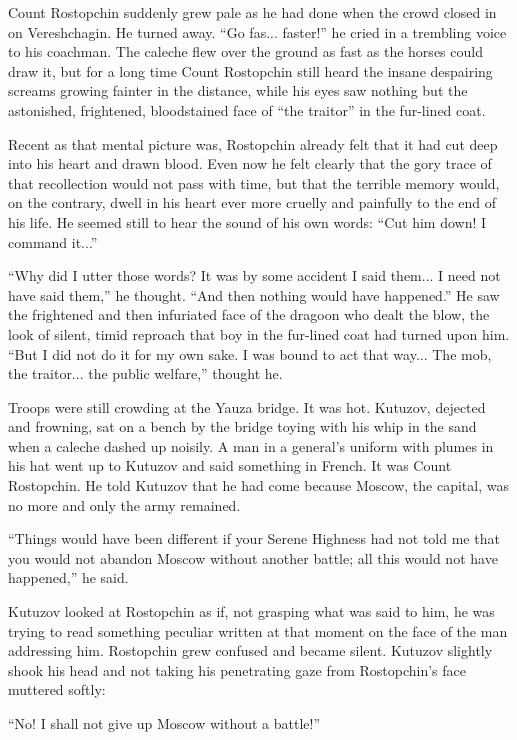 Count Rostopchin suddenly grew pale as he had done when the crowd
closed in on Vereshchagin. He turned away. ``Go fas... faster!''
he cried in a trembling voice to his coachman. The caleche flew
over the ground as fast as the horses could draw it, but for a
long time Count Rostopchin still heard the insane despairing
screams growing fainter in the distance, while his eyes saw
nothing but the astonished, frightened, bloodstained face of
``the traitor'' in the fur-lined coat.

Recent as that mental picture was, Rostopchin already felt that
it had cut deep into his heart and drawn blood. Even now he felt
clearly that the gory trace of that recollection would not pass
with time, but that the terrible memory would, on the contrary,
dwell in his heart ever more cruelly and painfully to the end of
his life. He seemed still to hear the sound of his own words:
``Cut him down! I command it...''

``Why did I utter those words? It was by some accident I said
them... I need not have said them,'' he thought. ``And then
nothing would have happened.'' He saw the frightened and then
infuriated face of the dragoon who dealt the blow, the look of
silent, timid reproach that boy in the fur-lined coat had turned
upon him. ``But I did not do it for my own sake. I was bound to
act that way... The mob, the traitor... the public welfare,''
thought he.

Troops were still crowding at the Yauza bridge. It was
hot. Kutuzov, dejected and frowning, sat on a bench by the bridge
toying with his whip in the sand when a caleche dashed up
noisily. A man in a general's uniform with plumes in his hat went
up to Kutuzov and said something in French. It was Count
Rostopchin. He told Kutuzov that he had come because Moscow, the
capital, was no more and only the army remained.

``Things would have been different if your Serene Highness had
not told me that you would not abandon Moscow without another
battle; all this would not have happened,'' he said.

Kutuzov looked at Rostopchin as if, not grasping what was said to
him, he was trying to read something peculiar written at that
moment on the face of the man addressing him. Rostopchin grew
confused and became silent. Kutuzov slightly shook his head and
not taking his penetrating gaze from Rostopchin's face muttered
softly:

``No! I shall not give up Moscow without a battle!''

